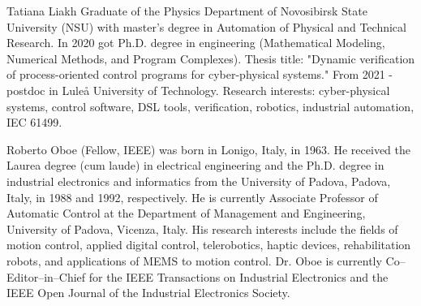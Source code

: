 \documentclass{ieeeojies}
\begin{document}
\begin{IEEEbiography}{Tatiana Liakh}
Graduate of the Physics Department of Novosibirsk State University (NSU) with master's degree in Automation of Physical and Technical Research. In 2020 got Ph.D. degree in engineering (Mathematical Modeling, Numerical Methods, and Program Complexes). Thesis title: "Dynamic verification of process-oriented control programs for cyber-physical systems." From 2021 - postdoc in Luleå University of Technology. Research interests: cyber-physical systems, control software, DSL tools, verification, robotics, industrial automation, IEC 61499.
\end{IEEEbiography}

\begin{IEEEbiography}{Roberto Oboe} (Fellow, IEEE) was born in Lonigo, Italy, in 1963. He received the Laurea degree (cum laude) in electrical engineering and the Ph.D. degree in industrial electronics and informatics from the University of Padova, Padova, Italy, in 1988 and 1992, respectively. He is currently Associate Professor of Automatic Control at the Department of Management and Engineering, University of Padova, Vicenza, Italy. His research interests include the fields of motion control, applied digital control, telerobotics, haptic devices, rehabilitation robots, and applications of MEMS to motion control. Dr. Oboe is currently Co--Editor--in--Chief for the IEEE Transactions on Industrial Electronics and the IEEE Open Journal of the Industrial Electronics Society. 
\end{IEEEbiography}
\end{document}
